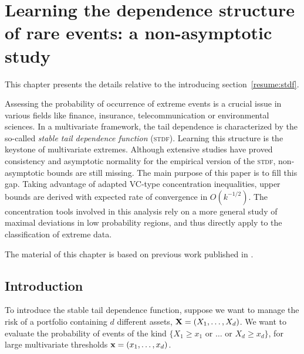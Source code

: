 \chapter{Learning the dependence structure of rare events:
a non-asymptotic study}
\label{colt}

\begin{chapabstract}
This chapter presents the details relative to the introducing section~\ref{resume:stdf}.

Assessing the probability of occurrence of extreme events is a crucial issue in various fields like finance, insurance, telecommunication or environmental sciences. In a multivariate framework, the tail dependence is characterized by the so-called \emph{stable tail dependence function} (\textsc{stdf}). Learning this structure is the keystone of multivariate extremes. Although extensive studies have proved consistency and asymptotic normality for the empirical version of the \textsc{stdf}, non-asymptotic bounds are still missing. The main purpose of this paper is to fill this gap. Taking advantage of adapted VC-type concentration inequalities, upper bounds are derived with expected rate of convergence in $O(k^{-1/2})$. The concentration tools involved in this analysis rely on a more general study of maximal deviations in low probability regions, and thus directly apply to the classification of extreme data.

The material of this chapter is based on previous work published in \cite{COLT15}.
\end{chapabstract}


\section{Introduction}
\label{colt:sec:intro}


To introduce the stable tail dependence function,  suppose we want to manage the risk of a
  portfolio  containing $d$ different assets,  $\mathbf
X = (X_1,\ldots,X_d)$.
We want to evaluate  the
probability of events of the kind 
$\{X_1 \ge x_1 \text{ or }  \dotsc \text{ or }
X_d\ge x_d \}$, for large multivariate thresholds $\mathbf
x=(x_1,\ldots,x_d)$.  
 
